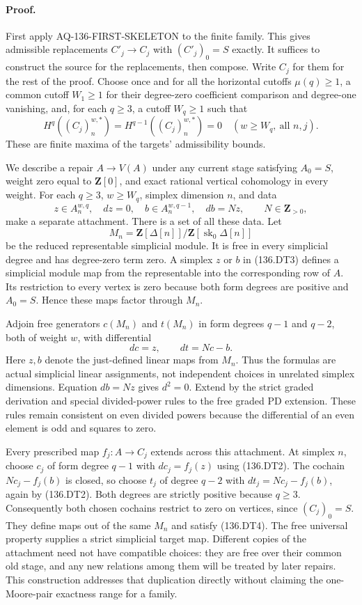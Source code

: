\paragraph{Proof.}
First apply AQ-136-FIRST-SKELETON to the finite family.  This gives
admissible replacements $C'_j\to C_j$ with $(C'_j)_0=S$ exactly.
It suffices to construct the source for the replacements, then
compose.  Write $C_j$ for them for the rest of the proof.  Choose
once and for all the horizontal cutoffs $\mu(q)\geq1$, a common
cutoff $W_1\geq1$ for their degree-zero coefficient comparison
and degree-one vanishing, and, for each $q\geq3$, a cutoff
$W_q\geq1$ such that
\[
 H^q((C_j)_n^{w,*})=H^{q-1}((C_j)_n^{w,*})=0
                \quad(w\geq W_q,\ \text{all }n,j).         \tag{136.DT2}
\]
These are finite maxima of the targets' admissibility bounds.

We describe a repair $A\to V(A)$ under any current stage satisfying
$A_0=S$, weight zero equal to $\mathbf Z[0]$, and exact rational
vertical cohomology in every weight.  For each $q\geq3$, $w\geq W_q$,
simplex dimension $n$, and data
\[
 z\in A_n^{w,q},\quad dz=0,\quad
 b\in A_n^{w,q-1},\quad db=N z,
                          \qquad N\in\mathbf Z_{>0},     \tag{136.DT3}
\]
make a separate attachment.  There is a set of all these data.
Let
\[
       M_n=\mathbf Z[\Delta[n]]/
                       \mathbf Z[\operatorname{sk}_0\Delta[n]]
\]
be the reduced representable simplicial module.  It is free in
every simplicial degree and has degree-zero term zero.  A simplex
$z$ or $b$ in (136.DT3) defines a simplicial module map from the
representable into the corresponding row of $A$.  Its restriction
to every vertex is zero because both form degrees are positive
and $A_0=S$.  Hence these maps factor through $M_n$.

Adjoin free generators $c(M_n)$ and $t(M_n)$ in form degrees
$q-1$ and $q-2$, both of weight $w$, with differential
\[
                   dc=z,\qquad dt=Nc-b.                 \tag{136.DT4}
\]
Here $z,b$ denote the just-defined linear maps from $M_n$.
Thus the formulas are actual simplicial linear assignments, not
independent choices in unrelated simplex dimensions.  Equation
$db=Nz$ gives $d^2=0$.  Extend by the strict graded derivation and
special divided-power rules to the free graded PD extension.
These rules remain consistent on even divided powers because the
differential of an even element is odd and squares to zero.

Every prescribed map $f_j:A\to C_j$ extends across this attachment.
At simplex $n$, choose $c_j$ of form degree $q-1$ with
$dc_j=f_j(z)$ using (136.DT2).  The cochain $Nc_j-f_j(b)$ is closed,
so choose $t_j$ of degree $q-2$ with
$dt_j=Nc_j-f_j(b)$, again by (136.DT2).
Both degrees are strictly positive because $q\geq3$.
Consequently both chosen cochains restrict to zero on vertices,
since $(C_j)_0=S$.  They define maps out of the same $M_n$ and
satisfy (136.DT4).  The free universal property supplies a strict
simplicial target map.  Different copies of the attachment need
not have compatible choices: they are free over their common old
stage, and any new relations among them will be treated by later
repairs.  This construction addresses that duplication directly
without claiming the one-Moore-pair exactness range for a family.


